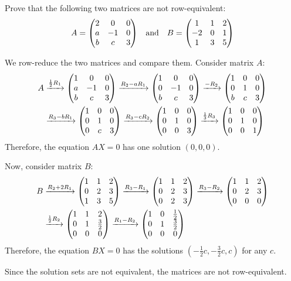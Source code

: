 \begin{xca}
  Prove that the following two matrices are not row-equivalent:
  \[ A = \mqty(2&0&0 \\ a&-1&0 \\ b&c&3) \qq{and} B = \mqty(1&1&2 \\ -2&0&1 \\ 1&3&5) \]
\end{xca}
\begin{sol}
  We row-reduce the two matrices and compare them.
  Consider matrix $A$:
  \begin{equation*}
    \begin{split}
      A & \xto{\frac12 R_1} \mqty(1&0&0 \\ a&-1&0 \\ b&c&3)
      \xto{R_2 - aR_1} \mqty(1&0&0 \\ 0&-1&0 \\ b&c&3)
      \xto{-R_2} \mqty(1&0&0 \\ 0&1&0 \\ b&c&3) \\
      & \xto{R_3 - bR_1} \mqty(1&0&0 \\ 0&1&0 \\ 0&c&3)
      \xto{R_3 - cR_2} \mqty(1&0&0 \\ 0&1&0 \\ 0&0&3)
      \xto{\frac13 R_3} \mqty(1&0&0 \\ 0&1&0 \\ 0&0&1)
    \end{split}
  \end{equation*}
  Therefore, the equation $AX = 0$ has one solution $(0,0,0)$.

  Now, consider matrix $B$:
  \begin{equation*}
    \begin{split}
      B & \xto{R_2 + 2R_1} \mqty(1&1&2 \\ 0&2&3 \\ 1&3&5)
      \xto{R_3 - R_1} \mqty(1&1&2 \\ 0&2&3 \\ 0&2&3)
      \xto{R_3 - R_2} \mqty(1&1&2 \\ 0&2&3 \\ 0&0&0) \\
      & \xto{\frac12 R_2} \mqty(1&1&2 \\ 0&1&\frac32 \\ 0&0&0)
      \xto{R_1 - R_2} \mqty(1&0&\frac12 \\ 0&1&\frac32 \\ 0&0&0)
    \end{split}
  \end{equation*}
  Therefore, the equation $BX = 0$ has the solutions $(-\frac12c, -\frac32c, c)$ for any $c$.

  Since the solution sets are not equivalent, the matrices are not row-equivalent.
\end{sol}

